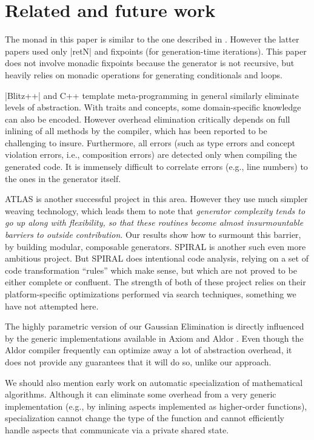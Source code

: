 \documentclass[draft]{elsart}
\begin{document}
\section{Related and future work}\label{related}

The monad in this paper is similar to the one described in
\cite{MSP:PADL04,KiselyovTaha}.  However the latter papers used only
|retN| and fixpoints (for generation-time iterations).  This paper
does not involve monadic fixpoints because the generator is not
recursive, but heavily relies on monadic operations for generating
conditionals and loops.

|Blitz++| \cite{Veldhuizen:1998:ISCOPE} and {C++} template
meta-programming in general similarly eliminate levels
of abstraction.  With traits and concepts, some domain-specific
knowledge can also be encoded.  However overhead elimination
critically depends on full inlining of all methods by the compiler,
which has been reported to be challenging to insure. Furthermore, all
errors (such as type errors and concept violation errors, i.e.,
composition errors) are detected only when compiling the generated
code. It is immensely difficult to correlate errors (e.g., line
numbers) to the ones in the generator itself.

ATLAS \cite{ATLAS} is another successful project in this area.  However
they use much simpler weaving technology, which leads them to note
that \emph{generator complexity tends to go up along with flexibility, 
so that these routines become almost insurmountable barriers to 
outside contribution}.  Our results show how to surmount this barrier,
by building modular, composable generators.
SPIRAL \cite{Pueschel:05} is another such even more ambitious project.
But SPIRAL does intentional code analysis, relying on a set of code
transformation ``rules'' which make sense, but which are not proved 
to be either complete or confluent.  The strength of both of these
project relies on their platform-specific optimizations performed
via search techniques, something we have not attempted here.

The highly parametric version of our Gaussian Elimination is directly
influenced by the generic implementations available in Axiom
\cite{Axiom} and Aldor \cite{Watt:2002:HCA}.  Even though the Aldor
compiler frequently can optimize away a lot of abstraction overhead, 
it does not provide any guarantees that it will do so, unlike our
approach.

We should also mention early work \cite{Gluck95} on automatic
specialization of mathematical algorithms. Although it can eliminate
some overhead from a very generic implementation (e.g., by inlining
aspects implemented as higher-order functions), specialization cannot
change the type of the function and cannot efficiently handle aspects
that communicate via a private shared state.
\end{document}
